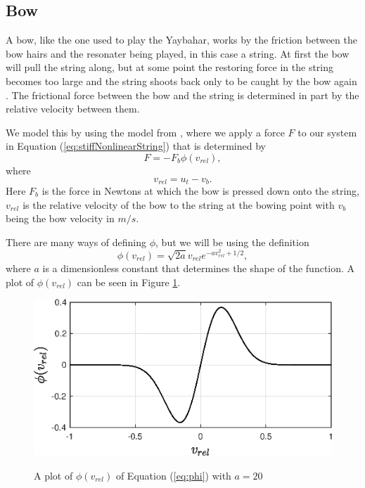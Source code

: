 \documentclass{article}
\begin{document}
\subsection{Bow}
\label{sec:bow}

A bow, like the one used to play the Yaybahar, works by the friction between the bow hairs and the resonater being played, in this case a string.
At first the bow will pull the string along, but at some point the restoring force in the string becomes too large and the string shoots back only to be caught by the bow again \cite[Chapter~2]{fletcher_physics_1998}.
The frictional force between the bow and the string is determined in part by the relative velocity between them.

We model this by using the model from \cite[Chapter~4]{bilbao_numerical_2009}, where we apply a force $F$ to our system in Equation (\ref{eq:stiffNonlinearString}) that is determined by
\begin{equation}
  \label{eq:bowForce}
  F = - F_b \phi(v_{rel}),
\end{equation}
where
\begin{equation}
  v_{rel} = u_t - v_b.
\end{equation}
Here $F_b$ is the force in Newtons at which the bow is pressed down onto the string, $v_{rel}$ is the relative velocity of the bow to the string at the bowing point with $v_b$ being the bow velocity in $m/s$.

There are many ways of defining $\phi$, but we will be using the definition
\begin{equation}
  \label{eq:phi}
  \phi(v_{rel}) = \sqrt{2a} v_{rel} e^{-a v_{rel}^2 + 1/2},
\end{equation}
where $a$ is a dimensionless constant that determines the shape of the function.
A plot of $\phi(v_{rel})$ can be seen in Figure \ref{fig:bowplot}.

\begin{figure}[h]
  \includegraphics[width=\linewidth]{bowplot.eps}
  \label{fig:bowplot}
  \caption{A plot of $\phi(v_{rel})$ of Equation (\ref{eq:phi}) with $a = 20$}
\end{figure}
\end{document}
